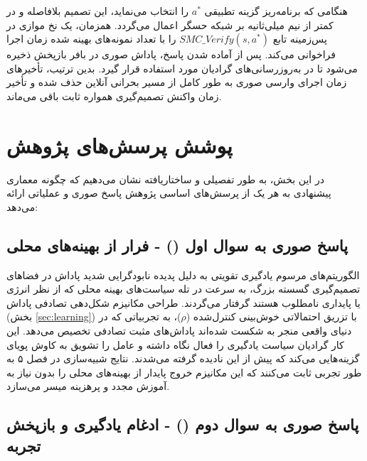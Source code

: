 \documentclass[oneside,openany,phd]{TMU-Thesis}
\begin{document}
هنگامی که برنامه‌ریز گزینه تطبیقی $a^*$ را انتخاب می‌نماید، این تصمیم بلافاصله و در کمتر از نیم میلی‌ثانیه بر شبکه حسگر اعمال می‌گردد. همزمان، یک نخ موازی در پس‌زمینه تابع $SMC\_Verify(s, a^*)$ را با تعداد نمونه‌های بهینه شده زمان اجرا فراخوانی می‌کند. پس از آماده شدن پاسخ، پاداش صوری در بافر بازپخش ذخیره می‌شود تا در به‌روزرسانی‌های گرادیان مورد استفاده قرار گیرد. بدین ترتیب، تأخیرهای زمان اجرای وارسی صوری به طور کامل از مسیر بحرانی آنلاین حذف شده و تأخیر زمان واکنش تصمیم‌گیری همواره ثابت باقی می‌ماند.



\section{پوشش پرسش‌های پژوهش}

\label{sec:rq-mapping}



در این بخش، به طور تفصیلی و ساختاریافته نشان می‌دهیم که چگونه معماری پیشنهادی  به هر یک از پرسش‌های اساسی پژوهش پاسخ صوری و عملیاتی ارائه می‌دهد:



\subsection{پاسخ صوری به سوال اول () - فرار از بهینه‌های محلی}

\label{subsec:rq1_ans}

الگوریتم‌های مرسوم یادگیری تقویتی \cite{sutton2018reinforcement} به دلیل پدیده نابودگرایی شدید پاداش \cite{du2023alleviating} در فضاهای تصمیم‌گیری گسسته بزرگ، به سرعت در تله سیاست‌های بهینه محلی که از نظر انرژی یا پایداری نامطلوب هستند گرفتار می‌گردند. طراحی مکانیزم شکل‌دهی تصادفی پاداش (بخش \ref{sec:learning}) با تزریق احتمالاتی خوش‌بینی کنترل‌شده ($\rho$)، به تجربیاتی که در دنیای واقعی منجر به شکست شده‌اند پاداش‌های مثبت تصادفی تخصیص می‌دهد. این کار گرادیان سیاست یادگیری را فعال نگاه داشته و عامل را تشویق به کاوش پویای گزینه‌هایی می‌کند که پیش از این نادیده گرفته می‌شدند. نتایج شبیه‌سازی در فصل ۵ به طور تجربی ثابت می‌کنند که این مکانیزم خروج پایدار از بهینه‌های محلی را بدون نیاز به آموزش مجدد و پرهزینه میسر می‌سازد.



\subsection{پاسخ صوری به سوال دوم () - ادغام یادگیری و بازپخش تجربه}

\label{subsec:rq2_ans}
\end{document}
